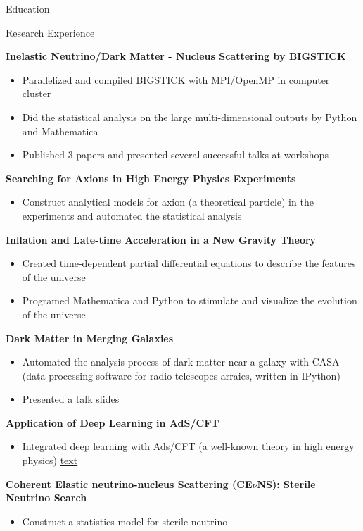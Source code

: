 \documentclass{resume}
\begin{document}
\begin{rSection}{Education}
\begin{rSection}{Research Experience}
\vspace{-1.25em}
\item \textbf{Inelastic Neutrino/Dark Matter - Nucleus Scattering by BIGSTICK}
    \begin{itemize}
    \itemsep -3pt {}
    \item Parallelized and compiled BIGSTICK with MPI/OpenMP in computer cluster
    \item Did the statistical analysis on the large multi-dimensional outputs by Python and Mathematica
    \item Published 3 papers and presented several successful talks at workshops
    \end{itemize}
    \item \textbf{Searching for Axions in High Energy Physics Experiments}
    \begin{itemize}
    \itemsep -3pt {}
    \item Construct analytical models for axion (a theoretical particle) in the experiments and automated the statistical analysis
    \end{itemize}
\item \textbf{Inflation and Late-time Acceleration in a New Gravity Theory}
    \begin{itemize}
    \itemsep -3pt {}
    \item Created time-dependent partial differential equations to describe the features of the universe
    \item Programed Mathematica and Python to stimulate and visualize the evolution of the universe
    \end{itemize}
\item \textbf{Dark Matter in Merging Galaxies}
    \begin{itemize}
    \itemsep -3pt {}
    \item Automated the analysis process of dark matter near a galaxy with CASA (data processing software for radio telescopes arraies, written in IPython)
    \item Presented a talk \href{https://noctildon.github.io/physics/dm.pdf}{slides}
    \end{itemize}
\item \textbf{Application of Deep Learning in AdS/CFT}
    \begin{itemize}
    \itemsep -3pt {}
    \item Integrated deep learning with Ads/CFT (a well-known theory in high energy physics) \href{https://noctildon.github.io/physics/DL.pdf}{text}
    \end{itemize}
\item \textbf{Coherent Elastic neutrino-nucleus Scattering (CE$\nu$NS): Sterile Neutrino Search}
    \begin{itemize}
    \itemsep -3pt {}
    \item Construct a statistics model for sterile neutrino
    \end{itemize}
\end{rSection}



\end{rSection}
\end{document}
